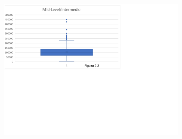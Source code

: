 \documentclass{article}
\begin{document}
	\begin{figure}
		\begin{subfigure}[b]{1.1\textwidth}
			\includegraphics[width=\textwidth]{FigurasTablas/figura2.2diagrama.png}
			\label{figura 2.2 diagrama}
		\end{subfigure}		
	\end{figure}
\end{document}
